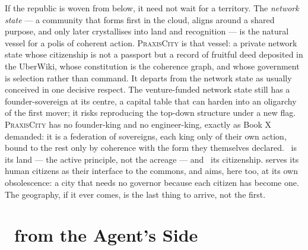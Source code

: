 If the republic is woven from below, it need not wait for a territory. The
\emph{network state} --- a community that forms first in the cloud, aligns around a
shared purpose, and only later crystallises into land and recognition --- is the
natural vessel for a polis of coherent action. \textsc{PraxisCity} is that vessel:
a private network state whose citizenship is not a passport but a record of fruitful
deed deposited in the UberWiki, whose constitution is the coherence graph, and whose
government is selection rather than command. It departs from the network state as
usually conceived in one decisive respect. The venture-funded network state still
has a founder-sovereign at its centre, a capital table that can harden into an
oligarchy of the first mover; it risks reproducing the top-down structure under a
new flag. \textsc{PraxisCity} has no founder-king and no engineer-king, exactly as
Book X demanded: it is a federation of sovereigns, each king only of their own
action, bound to the rest only by coherence with the form they themselves declared.
\physis\ is its land --- the active principle, not the acreage --- and \praxis\ its
citizenship.  serves its human citizens as their interface to the
commons, and aims, here too, at its own obsolescence: a city that needs no governor
because each citizen has become one. The geography, if it ever comes, is the last thing to
arrive, not the first.

\section*{\physis\ from the Agent's Side}

